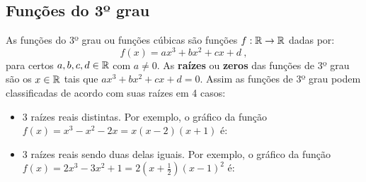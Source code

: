\subsection{Funções do 3º grau}
As funções do 3º grau ou funções cúbicas são funções $f: \mathbb{R} \rightarrow \mathbb{R}$ dadas por:
\begin{equation*}
f(x)= ax^3 + bx^2 + cx + d \ ,
\end{equation*}
para certos $a, b, c, d \in \mathbb{R}$ com $a \neq 0$. As \textbf{raízes} ou \textbf{zeros} das funções de 3º grau são os $x \in \mathbb{R}$ tais que $ax^3 + bx^2 + cx + d=0$. Assim as funções de 3º grau podem classificadas de acordo com suas raízes em 4 casos:
\begin{itemize}
 \item 3 raízes reais distintas. Por exemplo, o gráfico da função $f(x)= x^3-x^2-2x=x(x-2)(x+1)$ é:
 \begin{center}
\end{center}
 \item 3 raízes reais sendo duas delas iguais. Por exemplo, o gráfico da função $f(x)= 2x^3-3x^2+1=2(x+\frac{1}{2})(x-1)^2$ é:
 \begin{center}
\end{center}
\end{itemize}

